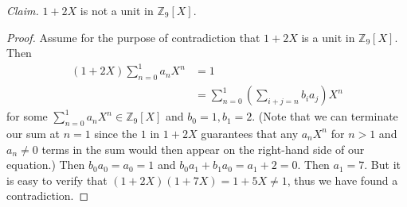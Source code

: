 \documentclass{abrice}
\newcommand{\Z}{\mathbb{Z}}
\begin{document}
\noindent
\emph{Claim.} $1 + 2X$ is not a unit in $\Z_9[X]$.

\begin{proof}
  Assume for the purpose of contradiction that $1 + 2X$ is a unit in $\Z_9[X]$.
  Then
  \begin{align*}
    (1 + 2X) \sum_{n=0}^{1} a_n X^n
    &= 1 \\
    &= \sum_{n=0}^{1} \left( \sum_{i+j=n} b_i a_j \right) X^n
  \end{align*}
  for some $\sum_{n=0}^1 a_n X^n \in \Z_9[X]$ and $b_0 = 1, b_1 = 2$. (Note that
  we can terminate our sum at $n = 1$ since the $1$ in $1 + 2X$ guarantees that
  any $a_n X^n$ for $n > 1$ and $a_n \neq 0$ terms in the sum would then appear
  on the right-hand side of our equation.) Then $b_0 a_0 = a_0 = 1$ and $b_0 a_1
  + b_1 a_0 = a_1 + 2 = 0$. Then $a_1 = 7$. But it is easy to verify that $(1 +
  2X) (1 + 7X) = 1 + 5X \neq 1$, thus we have found a contradiction.
\end{proof}
\end{document}
